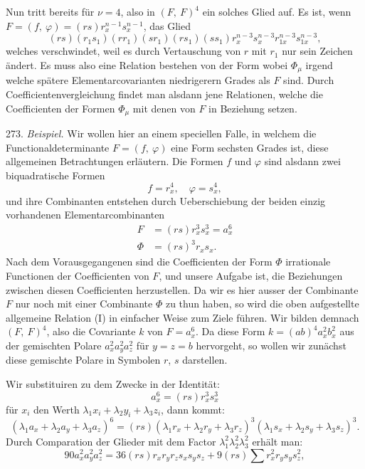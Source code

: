 
Nun tritt bereits für $\nu=4$, also in $(F,\ F)^4$ ein solches Glied
auf. Es ist, wenn $F=(f,\ \varphi)=(rs)r_x^{n-1}s_x^{n-1}$, das Glied
\[
(rs)(r_1s_1)(rr_1)(sr_1)(rs_1)(ss_1)r_x^{n-3}s_x^{n-3}r_{1x}^{n-3}s_{1x}^{n-3},
\]
welches verschwindet, weil es durch Vertauschung von $r$ mit $r_1$ nur
sein Zeichen ändert. Es muss also eine Relation bestehen von der
Form
wobei $\varPhi_\mu$ irgend welche spätere Elementarcovarianten niedrigerern %
Grades als $F$ sind. Durch Coefficientenvergleichung findet man alsdann
 jene Relationen, welche die Coefficienten der Formen $\varPhi_\mu$ mit
denen von $F$ in Beziehung setzen.

273. \textit{Beispiel.} Wir wollen hier an einem speciellen Falle, in
welchem die Functionaldeterminante $F=(f,\ \varphi)$ eine Form sechsten
Grades ist, diese allgemeinen Betrachtungen erläutern. Die Formen
$f$ und $\varphi$ sind alsdann zwei biquadratische Formen
\[
f=r_x^4,\quad \varphi=s_x^4,
\]
und ihre Combinanten entstehen durch Ueberschiebung der beiden
einzig vorhandenen Elementarcombinanten
\[
\begin{aligned}
F &= (rs)r_x^3s_x^3=a_x^6\\
\varPhi &= (rs)^3r_xs_x.
\end{aligned}
\]
Nach dem Vorausgegangenen sind die Coefficienten der Form $\varPhi$
irrationale Functionen der Coefficienten von $F$, und unsere Aufgabe
ist, die Beziehungen zwischen diesen Coefficienten herzustellen. Da
wir es hier ausser der Combinante $F$ nur noch mit einer Combinante
$\varPhi$ zu thun haben, so wird die oben aufgestellte allgemeine Relation
(I) in einfacher Weise zum Ziele führen. Wir bilden demnach $(F,\ F)^4$,
also die Covariante $k$ von $F=a_x^6$. Da diese Form $k=(ab)^4a_x^2b_x^2$
aus der gemischten Polare $a_x^2a_y^2a_z^2$ für $y=z=b$ hervorgeht, so wollen
wir zunächst diese gemischte Polare in Symbolen $r$, $s$ darstellen.

Wir substituiren zu dem Zwecke in der Identität:
\[
a_x^6=(rs)r_x^3s_x^3
\]
für $x_i$ den Werth $\lambda_1x_i+\lambda_2y_i+\lambda_3z_i$, dann kommt:
\[
(\lambda_1a_x+\lambda_2a_y+\lambda_3a_z)^6=(rs)(\lambda_1r_x+\lambda_2r_y+\lambda_3r_z)^3(\lambda_1s_x+\lambda_2s_y+\lambda_3s_z)^3.
\]
Durch Comparation der Glieder mit dem Factor $\lambda_1^2\lambda_2^2\lambda_3^2$ erhält man:
\[
90a_x^2a_y^2a_z^2=36(rs)r_xr_yr_zs_xs_ys_z+9(rs)\sum r_x^2r_ys_ys_z^2,
\]


